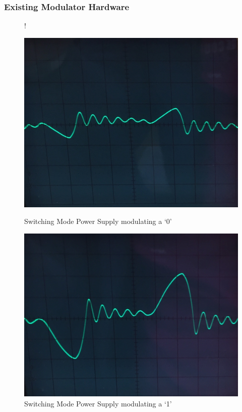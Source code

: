 \documentclass{beamer}
\begin{document}

	\begin{frame}\frametitle{Existing Modulator Hardware}

		\begin{figure}
			 {!} {
			  \centering
			  \begin{minipage}[b]{0.48\textwidth}
			    \includegraphics[width=\textwidth]{../chapters/hardware-chapters/AC/ac-modulator/smps-led/smps-current-primary-no-load-cropped.jpg}
			    \caption{Switching Mode Power Supply modulating a `0'}
			  \end{minipage}
			  \hfill
			  \begin{minipage}[b]{0.48\textwidth}
			    \includegraphics[width=\textwidth]{../chapters/hardware-chapters/AC/ac-modulator/smps-led/smps-current-primary-with-load-cropped.jpg}
			    \caption{Switching Mode Power Supply modulating a `1'}
			  \end{minipage}
		  }
		\end{figure}


\end{frame}
\end{document}
